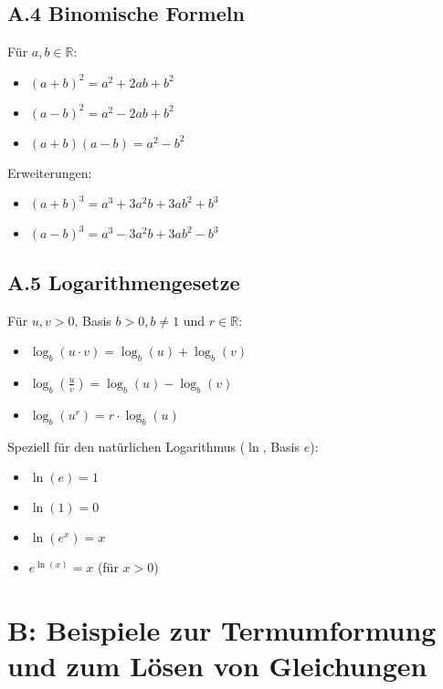 \begin{multicols}{2}
\subsection*{A.4 Binomische Formeln}
Für $a, b \in \mathbb{R}$:
\begin{itemize}
    \item $(a+b)^2 = a^2 + 2ab + b^2$
    \item $(a-b)^2 = a^2 - 2ab + b^2$
    \item $(a+b)(a-b) = a^2 - b^2$
\end{itemize}
Erweiterungen:
\begin{itemize}
    \item $(a+b)^3 = a^3 + 3a^2b + 3ab^2 + b^3$
    \item $(a-b)^3 = a^3 - 3a^2b + 3ab^2 - b^3$
\end{itemize}

\subsection*{A.5 Logarithmengesetze}
Für $u, v > 0$, Basis $b>0, b\neq 1$ und $r \in \mathbb{R}$:
\begin{itemize}
    \item $\log_b(u \cdot v) = \log_b(u) + \log_b(v)$
    \item $\log_b\left(\frac{u}{v}\right) = \log_b(u) - \log_b(v)$
    \item $\log_b(u^r) = r \cdot \log_b(u)$
\end{itemize}
Speziell für den natürlichen Logarithmus ($\ln$, Basis $e$):
\begin{itemize}
    \item $\ln(e) = 1$
    \item $\ln(1) = 0$
    \item $\ln(e^x) = x$
    \item $e^{\ln(x)} = x$ (für $x>0$)
\end{itemize}

\end{multicols}

\section*{B: Beispiele zur Termumformung und zum Lösen von Gleichungen}
\label{anhang:termumformungen}

